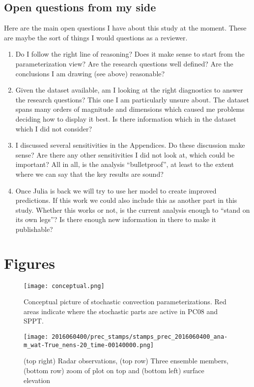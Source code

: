 \documentclass[a4paper, 12pt]{article}
\begin{document}
\subsection{Open questions from my side}
Here are the main open questions I have about this study at the moment. These are maybe the sort of things I would questions as a reviewer. 
\begin{enumerate}
 \item Do I follow the right line of reasoning? Does it make sense to start from the parameterization view? Are the research questions well defined? Are the conclusions I am drawing (see above) reasonable?
 \item Given the dataset available, am I looking at the right diagnostics to answer the research questions? This one I am particularly unsure about. The dataset spans many orders of magnitude and dimensions which caused me problems deciding how to display it best. Is there information which in the dataset which I did not consider? 
 \item I discussed several sensitivities in the Appendices. Do these discussion make sense? Are there any other sensitivities I did not look at, which could be important? All in all, is the analysis ``bulletproof'', at least to the extent where we can say that the key results are sound?
\item Once Julia is back we will try to use her model to create improved predictions. If this work we could also include this as another part in this study. Whether this works or not, is the current analysis enough to ``stand on its own legs''? Is there enough new information in there to make it publishable?
\end{enumerate}

\newpage

{\small
 }

\newpage
\section{Figures}


\begin{figure}[h!]
\noindent \centering
\texttt{[image: conceptual.png]}\\
\caption{Conceptual picture of stochastic convection parameterizations. Red areas indicate where the stochastic parts are active in PC08 and SPPT.} \label{fig:conceptual}
\end{figure}

\begin{figure}[h!]
\noindent \centering
\texttt{[image: 2016060400/prec\_stamps/stamps\_prec\_2016060400\_ana-m\_wat-True\_nens-20\_time-00140000.png]}\\
\caption{(top right) Radar observations, (top row) Three ensemble members, (bottom row) zoom of plot on top and (bottom left) surface elevation} \label{fig:prec_stamps}
\end{figure}
\end{document}
